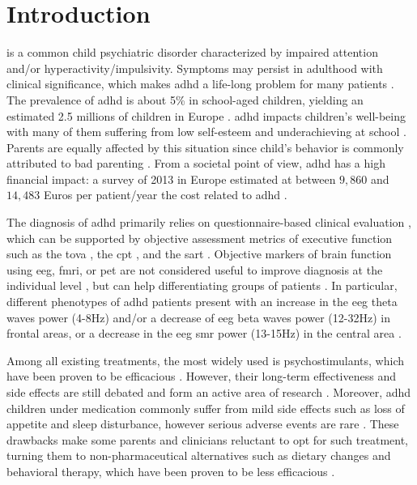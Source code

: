 

\section{Introduction} 

 is a common child psychiatric disorder characterized by impaired attention and/or hyperactivity/impulsivity.
Symptoms may persist in adulthood with clinical significance, which makes \gls{adhd} a life-long problem for many
patients \citep{Faraone2006}. The prevalence of \gls{adhd} is about 5\% in school-aged children, yielding an estimated
2.5 millions of children in Europe \citep{DSM-5}. \gls{adhd} impacts children's well-being with many of them suffering
from low self-esteem \citep{Shaw2005} and underachieving at school \citep{Barry2002}. Parents are equally affected by this
situation since child's behavior is commonly attributed to bad parenting \citep{Harpin2005}. From a societal point
of view, \gls{adhd} has a high financial impact: a survey of 2013 in Europe estimated at between $9,860$ and 
$14,483$ Euros per patient/year the cost related to \gls{adhd} \citep{le2014}. 

The diagnosis of \gls{adhd} primarily relies on questionnaire-based clinical evaluation \citep{DSM-5}, which can be
supported by objective assessment metrics of executive function such as the \gls{tova} \citep{Forbes1998}, the
\gls{cpt} \citep{Barkley1991}, and the \gls{sart} \citep{Robertson1997}. Objective markers of brain function
using \gls{eeg}, \gls{fmri}, or \gls{pet} are not considered useful to improve diagnosis at the individual
level \citep{Neba}, but can help differentiating groups of patients \citep{Johnstone2005}.  
In particular, different phenotypes of \gls{adhd} patients present with an increase in the \gls{eeg} theta waves 
power (4-8Hz) and/or a decrease of \gls{eeg} beta waves power (12-32Hz) in frontal areas, or a decrease in the \gls{eeg} 
\gls{smr} power (13-15Hz) in the central area \citep{Monastra2005, Matouvsek1984, Janzen1995, loo2017}.  

Among all existing treatments, the most widely used is psychostimulants, which have been proven to be efficacious
\citep{Taylor2014, Storebo2015}. However, their long-term effectiveness and side effects are still debated and form 
an active area of research \citep{DuPaul1998, Swanson2001, Jensen1999}. Moreover, \gls{adhd} children under medication 
commonly suffer from mild side effects such as loss of appetite and sleep disturbance, however serious adverse events
are rare \citep{Storebo2015, Cooper2011}. These drawbacks make some parents and clinicians reluctant to 
opt for such treatment, turning them to non-pharmaceutical alternatives such as dietary changes \citep{Belanger2009} and behavioral 
therapy, which have been proven to be less efficacious \citep{Sonuga-Barke2013}.

